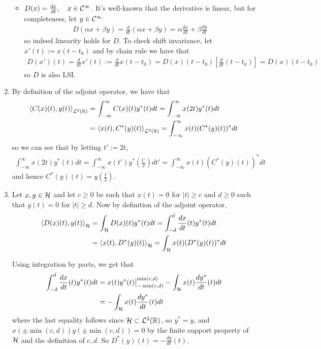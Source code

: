 \documentclass{article}
\makeatletter
\newcommand{\skipitems}[1]{%
  \addtocounter{\@enumctr}{#1}%
}
\makeatother
\begin{document}
\begin{enumerate}[label=(\roman*)]
\begin{itemize}
            \item $D(x)=\frac{dx}{dt},\quad x\in \mathcal{C}^\infty$. It's well-known that the derivative is linear, but for completeness, let $y\in \mathcal{C}^\infty$
            \begin{align}
                D(\alpha x + \beta y) = \frac{d}{dt}(\alpha x + \beta y) = \alpha \frac{dx}{dt} + \beta \frac{dy}{dt}
            \end{align}
            so indeed linearity holds for $D$. To check shift invariance, let $x'(t):=x(t-t_0)$ and by chain rule we have that
            \begin{align}
                D(x')(t)=\frac{d}{dt}x'(t) := \frac{d}{dt}x(t-t_0) =  D(x)(t-t_0) \left[\frac{d}{dt}(t-t_0)\right] =  D(x)(t-t_0)
            \end{align}
            so $D$ is also LSI.
        \end{itemize}
        
        \skipitems{1}
        \item By definition of the adjoint operator, we have that
        \begin{align}
            \left\langle C(x)(t),y(t) \right\rangle_{\mathcal{L}^2(\mathbb{R})} &= \int_{-\infty}^{\infty} C(x)(t)y^*(t) dt = \int_{-\infty}^{\infty} x(2t) y^*(t) dt \\
            &= \left\langle x(t),C^*(y)(t) \right\rangle_{\mathcal{L}^2(\mathbb{R})} = \int_{-\infty}^{\infty} x(t) (C^*(y)(t))^* dt
        \end{align}
        so we can see that by letting $t':=2t$,
        \begin{align}
            \int_{-\infty}^{\infty} x(2t) y^*(t) dt = \int_{-\infty}^{\infty} x(t') y^*\left(\frac{t'}{2}\right) dt'= \int_{-\infty}^{\infty} x(t) (C^*(y)(t))^* dt
        \end{align}
        and hence $C^*(y)(t)=y\left(\frac{t}{2}\right)$.
        \item Let $x,y\in \mathcal{H}$ and let $c\geq 0$ be such that $x(t)=0$ for $|t|\geq c$ and $d\geq 0$ such that $y(t)=0$ for $|t|\geq d$. Now by definition of the adjoint operator,
        \begin{align}
            \left\langle D(x)(t),y(t) \right\rangle_{\mathcal{H}} &= \int_{\mathcal{H}} D(x)(t)y^*(t) dt = \int_{-d }^{d} \frac{dx}{dt}(t) y^*(t) dt \\
            &= \left\langle x(t),D^*(y)(t) \right\rangle_{\mathcal{H}} = \int_{\mathcal{H}} x(t) (D^*(y)(t))^* dt
        \end{align}
        
        Using integration by parts, we get that
        \begin{align}
            \int_{-d }^{d} \frac{dx}{dt}(t) y^*(t) dt &=  x(t) y^*(t) \big\rvert_{-\min(c,d)}^{\min(c,d)} -  \int_{\mathcal{H}} x(t) \frac{dy^*}{dt}(t) dt \\
            &= -  \int_{\mathcal{H}} x(t) \frac{dy^*}{dt}(t) dt
        \end{align}
        where the last equality follows since $\mathcal{H}\subset \mathcal{L}^2(\mathbb{R})$, so $y^* = y$, and $x(\pm \min(c,d))y(\pm \min(c,d))=0$ by the finite support property of $\mathcal{H}$ and the definition of $c,d$. So $D^*(y)(t)=-\frac{dy}{dt}(t)$.
        
    \end{enumerate}
    
\end{document}
